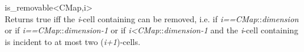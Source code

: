 \ccRefPageBegin

\begin{ccRefFunction}{is_removable<CMap,i>}
\\
         {Returns true iff the \emph{i}-cell containing  can be removed,
          i.e. if \emph{i==CMap}::\emph{dimension} or if 
          \emph{i==CMap}::\emph{dimension-1} or 
          if \emph{i<CMap}::\emph{dimension-1} and the \emph{i}-cell containing  
          is incident to at most two (\emph{i+1})-cells.
}

\ccSeeAlso
{}\\
\end{ccRefFunction}
